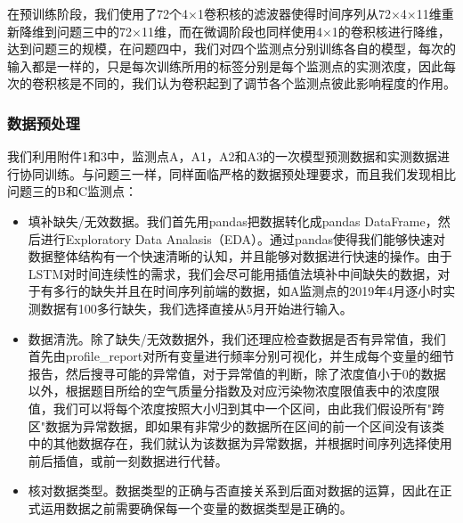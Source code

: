 \documentclass[bwprint]{gmcmthesis}
\numberwithin{figure}{section}
\begin{document}
在预训练阶段，我们使用了72个4×1卷积核的滤波器使得时间序列从72×4×11维重新降维到问题三中的72×11维，而在微调阶段也同样使用4×1的卷积核进行降维，达到问题三的规模，在问题四中，我们对四个监测点分别训练各自的模型，每次的输入都是一样的，只是每次训练所用的标签分别是每个监测点的实测浓度，因此每次的卷积核是不同的，我们认为卷积起到了调节各个监测点彼此影响程度的作用。
\subsubsection{数据预处理}
我们利用附件1和3中，监测点A，A1，A2和A3的一次模型预测数据和实测数据进行协同训练。与问题三一样，同样面临严格的数据预处理要求，而且我们发现相比问题三的B和C监测点：
\begin{itemize}
	\item 填补缺失/无效数据。我们首先用pandas把数据转化成pandas DataFrame，然后进行Exploratory Data Analasis（EDA）。通过pandas使得我们能够快速对数据整体结构有一个快速清晰的认知，并且能够对数据进行快速的操作。由于LSTM对时间连续性的需求，我们会尽可能用插值法填补中间缺失的数据，对于有多行的缺失并且在时间序列前端的数据，如A监测点的2019年4月逐小时实测数据有100多行缺失，我们选择直接从5月开始进行输入。
	\item 数据清洗。除了缺失/无效数据外，我们还理应检查数据是否有异常值，我们首先由profile_report对所有变量进行频率分别可视化，并生成每个变量的细节报告，然后搜寻可能的异常值，对于异常值的判断，除了浓度值小于0的数据以外，根据题目所给的空气质量分指数及对应污染物浓度限值表中的浓度限值，我们可以将每个浓度按照大小归到其中一个区间，由此我们假设所有"跨区"数据为异常数据，即如果有非常少的数据所在区间的前一个区间没有该类中的其他数据存在，我们就认为该数据为异常数据，并根据时间序列选择使用前后插值，或前一刻数据进行代替。
	\item 核对数据类型。数据类型的正确与否直接关系到后面对数据的运算，因此在正式运用数据之前需要确保每一个变量的数据类型是正确的。
\end{itemize}
\end{document}
